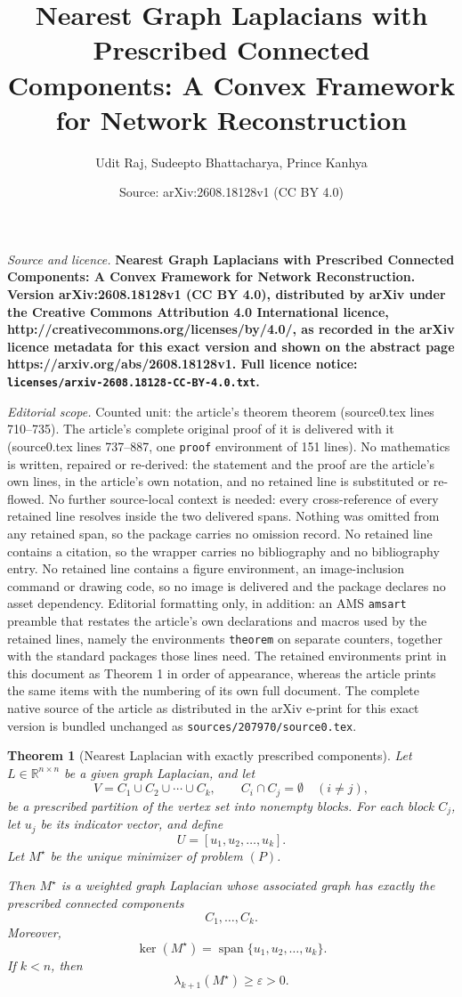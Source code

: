 \documentclass[10pt,a4paper]{amsart}
\title{\bf Nearest Graph Laplacians with Prescribed Connected Components: A Convex Framework for Network Reconstruction}
\author{Udit Raj, Sudeepto Bhattacharya, Prince Kanhya}
\date{Source: arXiv:2608.18128v1 (CC BY 4.0)}
\newtheorem{theorem}{Theorem}
\begin{document}
\maketitle

\noindent\emph{Source and licence.} \bf Nearest Graph Laplacians with Prescribed Connected Components: A Convex Framework for Network Reconstruction. Version arXiv:2608.18128v1 (CC BY 4.0), distributed by arXiv under the Creative Commons Attribution 4.0 International licence, http://creativecommons.org/licenses/by/4.0/, as recorded in the arXiv licence metadata for this exact version and shown on the abstract page https://arxiv.org/abs/2608.18128v1. Full licence notice: \texttt{licenses/arxiv-2608.18128-CC-BY-4.0.txt}.\par\smallskip

\noindent\textit{Editorial scope.} Counted unit: the article's theorem theorem (source0.tex lines 710--735). The article's complete original proof of it is delivered with it (source0.tex lines 737--887, one \texttt{proof} environment of 151 lines). No mathematics is written, repaired or re-derived: the statement and the proof are the article's own lines, in the article's own notation, and no retained line is substituted or re-flowed.  No further source-local context is needed: every cross-reference of every retained line resolves inside the two delivered spans.  Nothing was omitted from any retained span, so the package carries no omission record.  No retained line contains a citation, so the wrapper carries no bibliography and no bibliography entry.  No retained line contains a figure environment, an image-inclusion command or drawing code, so no image is delivered and the package declares no asset dependency.  Editorial formatting only, in addition: an AMS \texttt{amsart} preamble that restates the article's own declarations and macros used by the retained lines, namely the environments \texttt{theorem} on separate counters, together with the standard packages those lines need.  The retained environments print in this document as Theorem 1 in order of appearance, whereas the article prints the same items with the numbering of its own full document.  The complete native source of the article as distributed in the arXiv e-print for this exact version is bundled unchanged as \texttt{sources/207970/source0.tex}.
\begin{theorem}[Nearest Laplacian with exactly prescribed components]
	Let $L\in\mathbb R^{n\times n}$ be a given graph Laplacian, and let
	\[
	V=C_1\cup C_2\cup\cdots\cup C_k,
	\qquad
	C_i\cap C_j=\emptyset\quad (i\ne j),
	\]
	be a prescribed partition of the vertex set into nonempty blocks. For each block $C_j$, let $u_j$ be its indicator vector, and define
	\[
	U=[u_1,u_2,\ldots,u_k].
	\]
	Let $M^\star$ be the unique minimizer of problem $(P)$.
	
	Then $M^\star$ is a weighted graph Laplacian whose associated graph has exactly the prescribed connected components
	\[
	C_1,\ldots,C_k.
	\]
	Moreover,
	\[
	\ker(M^\star)=\operatorname{span}\{u_1,u_2,\ldots,u_k\}.
	\]
	If $k<n$, then
	\[
	\lambda_{k+1}(M^\star)\ge \varepsilon>0.
	\]
\end{theorem}
\end{document}

